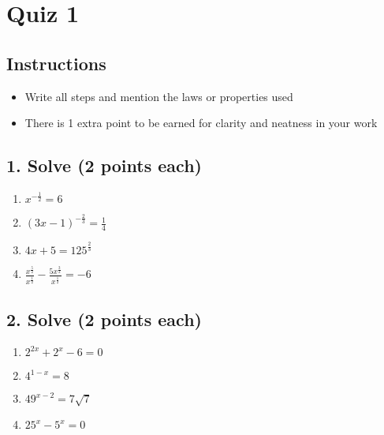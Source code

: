 \documentclass{hw}
\begin{document}
\section*{Quiz 1}

\subsection*{Instructions}
\begin{itemize}
    \item Write all steps and mention the laws or properties used
    \item There is 1 extra point to be earned for clarity and neatness in your work
\end{itemize}

\subsection*{1. Solve (2 points each)}
\begin{enumerate}[label=\alph*.]
    \item $x^{-\frac{1}{2}} = 6$
    \studentxxlargeworkspace
    \item $(3x-1)^{-\frac{2}{3}} = \frac{1}{4}$
    \studentxxlargeworkspace
    \item $4x + 5 = 125^{\frac{2}{3}}$
    \studentxxlargeworkspace
    \item $\frac{x^\frac{5}{2}}{x^{\frac{1}{2}}} - \frac{5x^{\frac{3}{2}}}{x^\frac{1}{2}} = -6$
    \studentxxlargeworkspace
\end{enumerate}

\subsection*{2. Solve (2 points each)}
\begin{enumerate}[label=\alph*.]
    \item $2^{2x} + 2^x - 6 = 0$
    \studentxxlargeworkspace
    \item $4^{1-x} = 8$
    \studentxxlargeworkspace
    \newpage
    \item $49^{x-2} = 7\sqrt{7}$
    \studentxxlargeworkspace
    \item $25^x - 5^x = 0$
    \studentxlargeworkspace
\end{enumerate}

\newpage
\end{document}
